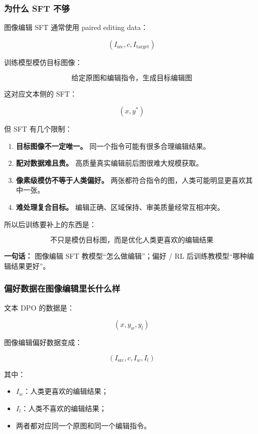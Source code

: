 \subsubsection{为什么 SFT 不够}

图像编辑 SFT 通常使用 paired editing data：

\[
(I_\text{src}, c, I_\text{target})
\]

训练模型模仿目标图像：

\[
\text{给定原图和编辑指令，生成目标编辑图}
\]

这对应文本侧的 SFT：

\[
(x,y^\ast)
\]

但 SFT 有几个限制：

\begin{enumerate}[leftmargin=1.5em]
  \item \textbf{目标图像不一定唯一。} 同一个指令可能有很多合理编辑结果。
  \item \textbf{配对数据难且贵。} 高质量真实编辑前后图很难大规模获取。
  \item \textbf{像素级模仿不等于人类偏好。} 两张都符合指令的图，人类可能明显更喜欢其中一张。
  \item \textbf{难处理复合目标。} 编辑正确、区域保持、审美质量经常互相冲突。
\end{enumerate}

所以后训练要补上的东西是：

\[
\text{不只是模仿目标图，而是优化人类更喜欢的编辑结果}
\]

\begin{summarybox}
\textbf{一句话：} 图像编辑 SFT 教模型“怎么做编辑”；偏好 / RL 后训练教模型“哪种编辑结果更好”。
\end{summarybox}

\subsubsection{偏好数据在图像编辑里长什么样}

文本 DPO 的数据是：

\[
(x,y_w,y_l)
\]

图像编辑偏好数据变成：

\[
(I_\text{src}, c, I_w, I_l)
\]

其中：

\begin{itemize}[leftmargin=1.5em]
  \item $I_w$：人类更喜欢的编辑结果；
  \item $I_l$：人类不喜欢的编辑结果；
  \item 两者都对应同一个原图和同一个编辑指令。
\end{itemize}

